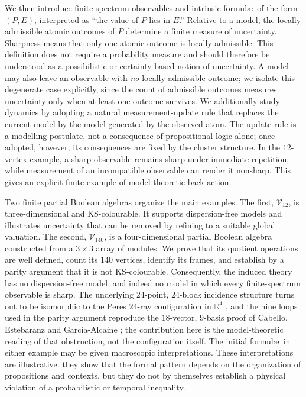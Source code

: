 \documentclass{article}   	%
\theoremstyle{plain}
\theoremstyle{definition}
\theoremstyle{remark}
\begin{document}
We then introduce finite-spectrum observables and intrinsic formul\ae\ of the form $(P,E)$, interpreted as ``the value of $P$ lies in $E$.''  Relative to a model, the locally admissible atomic outcomes of $P$ determine a finite measure of uncertainty.  Sharpness means that only one atomic outcome is locally admissible.  This definition does not require a probability measure and should therefore be understood as a possibilistic or certainty-based notion of uncertainty.  A model may also leave an observable with \emph{no} locally admissible outcome; we isolate this degenerate case explicitly, since the count of admissible outcomes measures uncertainty only when at least one outcome survives.  We additionally study dynamics by adopting a natural measurement-update rule that replaces the current model by the model generated by the observed atom.  The update rule is a modelling postulate, not a consequence of propositional logic alone; once adopted, however, its consequences are fixed by the cluster structure.  In the $12$-vertex example, a sharp observable remains sharp under immediate repetition, while measurement of an incompatible observable can render it nonsharp.  This gives an explicit finite example of model-theoretic back-action.

Two finite partial Boolean algebras organize the main examples.  The first, $\mathcal V_{12}$, is three-dimensional and KS-colourable.  It supports dispersion-free models and illustrates uncertainty that can be removed by refining to a suitable global valuation.  The second, $\mathcal V_{140}$, is a four-dimensional partial Boolean algebra constructed from a $3\times3$ array of modules.  We prove that its quotient operations are well defined, count its $140$ vertices, identify its frames, and establish by a parity argument that it is not KS-colourable.  Consequently, the induced theory has no dispersion-free model, and indeed no model in which every finite-spectrum observable is sharp.  The underlying $24$-point, $24$-block incidence structure turns out to be isomorphic to the Peres $24$-ray configuration in $\mathbb R^{4}$ \cite{Peres1991}, and the nine loops used in the parity argument reproduce the $18$-vector, $9$-basis proof of Cabello, Estebaranz and Garc\'ia-Alcaine \cite{Cabello1996}; the contribution here is the model-theoretic reading of that obstruction, not the configuration itself.  The initial formul\ae\ in either example may be given macroscopic interpretations.  These interpretations are illustrative: they show that the formal pattern depends on the organization of propositions and contexts, but they do not by themselves establish a physical violation of a probabilistic or temporal inequality.
\end{document}
